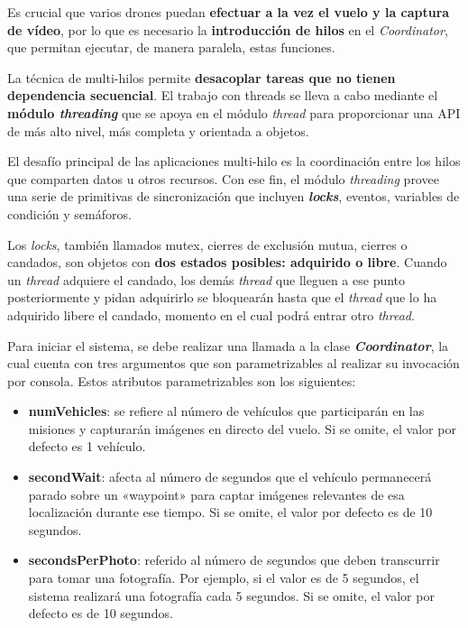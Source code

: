 Es crucial que varios drones puedan \textbf{efectuar a la vez el vuelo y la captura de vídeo}, por lo que es necesario la \textbf{introducción de hilos} en el \textit{Coordinator}, que permitan ejecutar, de manera paralela, estas funciones. 

La técnica de multi-hilos permite \textbf{desacoplar tareas que no tienen dependencia secuencial}. El trabajo con threads se lleva a cabo mediante el \textbf{módulo \textit{threading}} que se apoya en el módulo \textit{thread} para proporcionar una \acs{API} de más alto nivel, más completa y orientada a objetos. 

El desafío principal de las aplicaciones multi-hilo es la coordinación entre los hilos que comparten datos u otros recursos. Con ese fin, el módulo \textit{threading} provee una serie de primitivas de sincronización que incluyen \textbf{\textit{locks}}, eventos, variables de condición y semáforos. 

Los \textit{locks}, también llamados mutex, cierres de exclusión mutua, cierres o candados, son objetos con \textbf{dos estados posibles: adquirido o libre}. Cuando un \textit{thread} adquiere el candado, los demás \textit{thread} que lleguen a ese punto posteriormente y pidan adquirirlo se bloquearán hasta que el \textit{thread} que lo ha adquirido libere el candado, momento en el cual podrá entrar otro \textit{thread}.

Para iniciar el sistema, se debe realizar una llamada a la clase \textbf{\textit{Coordinator}}, la cual cuenta con tres argumentos que son parametrizables al realizar su invocación por consola. Estos atributos parametrizables son los siguientes:
\begin{itemize}
\item \textbf{numVehicles}: se refiere al número de vehículos que participarán en las misiones y capturarán imágenes en directo del vuelo. Si se omite, el valor por defecto es 1 vehículo.
\item \textbf{secondWait}: afecta al número de segundos que el vehículo permanecerá parado sobre un «waypoint» para captar imágenes relevantes de esa localización durante ese tiempo. Si se omite, el valor por defecto es de 10 segundos.
\item \textbf{secondsPerPhoto}: referido al número de segundos que deben transcurrir para tomar una fotografía. Por ejemplo, si el valor es de 5 segundos, el sistema realizará una fotografía cada 5 segundos. Si se omite, el valor por defecto es de 10 segundos.
\end{itemize} 

